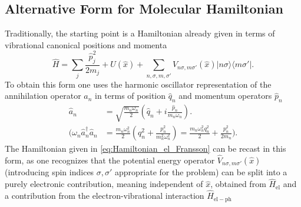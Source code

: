 \documentclass{article}
\newcommand{\state}[1]{\vert #1\rangle}
\newcommand{\cstate}[1]{\langle #1\vert}
\begin{document}
\subsection{Alternative Form for Molecular Hamiltonian}
Traditionally, the starting point is a Hamiltonian already given in terms of vibrational canonical positions and momenta
\begin{equation}
	\hat{H} = \sum_j \frac{\hat{p}_j^2}{2m_j} + U(\hat{x}) + \sum_{n,\sigma,m,\sigma'} V_{n\sigma,m\sigma'}(\hat{x})\state{n\sigma}\cstate{m\sigma'}.\label{eq:MappingHamiltonian0}
\end{equation}
To obtain this form one uses the harmonic oscillator representation of the annihilation operator $\hat{a}_n$ in terms of position $\hat{q}_n$ and momentum operators $\hat{p}_n$
\begin{equation}
	\begin{split}
		\hat{a}_n&= \sqrt{\frac{m_n \omega_n}{2}} \left(\hat{q}_n + i\frac{\hat{p}_n}{m_n \omega_n}\right).\\
		\Bigg(\omega_n \hat{a}_n^\dagger \hat{a}_n &= \frac{m_n \omega_n^2}{2} \left(q_n^2 + \frac{p_n^2}{m_n^2 \omega_n^2}\right) = \frac{m_n \omega_n^2 q_n^2 }{2} + \frac{p_n^2}{2m_n}\Bigg).
	\end{split}
\end{equation}
The Hamiltonian given in \cref{eq:Hamiltonian_el_Fransson} can be recast in this form, as one recognizes that the potential energy operator $\hat{V}_{n\sigma, m\sigma'}(\hat{x})$ (introducing spin indices $\sigma,\sigma'$ appropriate for the problem) can be split into a purely electronic contribution, meaning independent of $\hat{x}$, obtained from $\hat{H}_\mathrm{el}$ and a contribution from the electron-vibrational interaction $\hat{H}_\mathrm{el-ph}$
\end{document}
